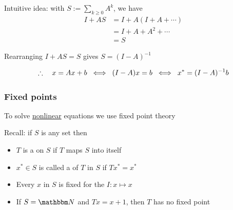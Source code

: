 \begin{frame}
    
    Intuitive idea: with $S := \sum_{k \geq 0} A^k$, we have
    \begin{align*}
        I + AS 
        & = I + A (I + A + \cdots)
        \\
        & = I + A + A^2 + \cdots 
        \\
        & = S
    \end{align*}

    Rearranging $I + AS = S$ gives $S = (I - A)^{-1}$
            \vspace{0.5em}
            \vspace{0.5em}

    \begin{equation*}
        \therefore \quad
        x = Ax + b
        \; \iff \; 
        (I - A)x = b
        \; \iff \; 
        x^* = (I-A)^{-1} b
    \end{equation*}


\end{frame}


\begin{frame}
    \frametitle{Fixed points}    

    To solve \underline{nonlinear} equations we use fixed point theory

            \vspace{0.4em}
            \vspace{0.4em}
    Recall: if $S$ is any set then
    \begin{itemize}
        \item $T$ is a  on $S$ if $T$ maps $S$ into itself
            \vspace{0.4em}
        \item  $x^* \in S$ is called a
             of $T$ in $S$ if $T x^* = x^*$  
    \end{itemize}

            \vspace{0.4em}
            \vspace{0.4em}
    \Egs 
    \begin{itemize}
        \item Every $x$ in $S$ is fixed for the 
            $I \colon x \mapsto x$
            \vspace{0.4em}
        \item If $S = \NN$ and $Tx = x+1$, then $T$ has no fixed point
    \end{itemize}


\end{frame}


